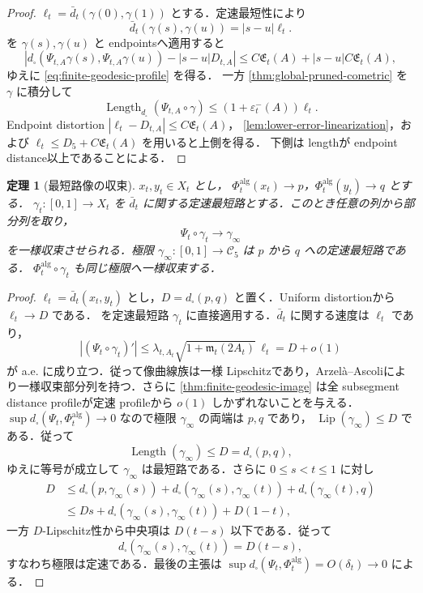 \documentclass[a4paper,11pt]{ltjsarticle}
\numberwithin{equation}{section}
\theoremstyle{plain}
\newtheorem{theorem}{定理}[section]
\theoremstyle{definition}
\theoremstyle{remark}
\newcommand{\cC}{\mathcal C}
\newcommand{\eps}{\varepsilon}
\newcommand{\Length}{\operatorname{Length}}
\newcommand{\Lip}{\operatorname{Lip}}
\begin{document}
\begin{proof}
$\ell_t=\bar d_t(\gamma(0),\gamma(1))$ とする．定速最短性により
\[
 \bar d_t(\gamma(s),\gamma(u))=|s-u|\ell_t.
\]
 を $\gamma(s),\gamma(u)$ と endpointsへ適用すると
\[
 \left|d_\square(\Psi_{t,A}\gamma(s),\Psi_{t,A}\gamma(u))
       -|s-u|D_{t,A}\right|
 \le C\mathfrak E_t(A)+|s-u|C\mathfrak E_t(A),
\]
ゆえに \eqref{eq:finite-geodesic-profile} を得る．
一方 \cref{thm:global-pruned-cometric} を $\gamma$ に積分して
\[
 \Length_{d_\square}(\Psi_{t,A}\circ\gamma)
 \le(1+\eps_t^-(A))\ell_t.
\]
Endpoint distortion $|\ell_t-D_{t,A}|\le C\mathfrak E_t(A)$，
\cref{lem:lower-error-linearization}，および $\ell_t\le D_5+C\mathfrak E_t(A)$ を用いると上側を得る．
下側は lengthが endpoint distance以上であることによる．
\end{proof}

\begin{theorem}[最短路像の収束]\label{thm:geodesic-image-convergence}
$x_t,y_t\in X_t$ とし，
$\Phi_t^{\mathrm{alg}}(x_t)\to p$，$\Phi_t^{\mathrm{alg}}(y_t)\to q$ とする．
$\gamma_t:[0,1]\to X_t$ を $\bar d_t$ に関する定速最短路とする．このとき任意の列から部分列を取り，
\[
 \Psi_t\circ\gamma_t\longrightarrow\gamma_\infty
\]
を一様収束させられる．極限 $\gamma_\infty:[0,1]\to\cC_5$ は $p$ から $q$ への定速最短路である．
$\Phi_t^{\mathrm{alg}}\circ\gamma_t$ も同じ極限へ一様収束する．
\end{theorem}

\begin{proof}
$\ell_t=\bar d_t(x_t,y_t)$ とし，$D=d_\square(p,q)$ と置く．Uniform distortionから $\ell_t\to D$ である．
 を定速最短路 $\gamma_t$ に直接適用する．$\bar d_t$ に関する速度は $\ell_t$ であり，
\[
 |(\Psi_t\circ\gamma_t)'|
 \le \lambda_{t,A_t}\sqrt{1+\mathfrak m_t(2A_t)}\,\ell_t
 =D+o(1)
\]
が a.e. に成り立つ．従って像曲線族は一様 Lipschitzであり，Arzelà--Ascoliにより一様収束部分列を持つ．さらに \cref{thm:finite-geodesic-image} は全 subsegment distance profileが定速 profileから $o(1)$ しかずれないことを与える．
$\sup d_\square(\Psi_t,\Phi_t^{\mathrm{alg}})\to0$ なので極限 $\gamma_\infty$ の両端は $p,q$ であり，
$\Lip(\gamma_\infty)\le D$ である．従って
\[
 \Length(\gamma_\infty)\le D=d_\square(p,q),
\]
ゆえに等号が成立して $\gamma_\infty$ は最短路である．さらに $0\le s<t\le1$ に対し
\begin{align*}
 D
 &\le d_\square(p,\gamma_\infty(s))
      +d_\square(\gamma_\infty(s),\gamma_\infty(t))
      +d_\square(\gamma_\infty(t),q)\\
 &\le Ds+d_\square(\gamma_\infty(s),\gamma_\infty(t))+D(1-t),
\end{align*}
一方 $D$-Lipschitz性から中央項は $D(t-s)$ 以下である．従って
\[
 d_\square(\gamma_\infty(s),\gamma_\infty(t))=D(t-s),
\]
すなわち極限は定速である．最後の主張は
$\sup d_\square(\Psi_t,\Phi_t^{\mathrm{alg}})=O(\delta_t)\to0$ による．
\end{proof}
\end{document}
